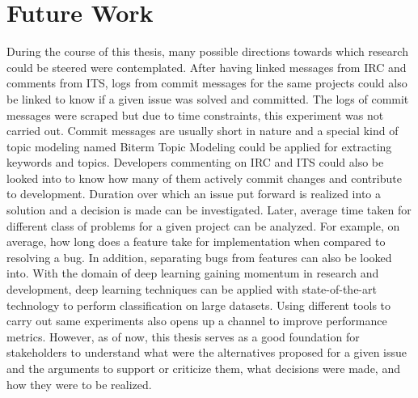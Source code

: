 \documentclass[a4paper,12pt,twoside]{report}
\begin{document}
\section{Future Work}
During the course of this thesis, many possible directions towards which research could be steered were contemplated. After having linked messages from IRC and comments from ITS, logs from commit messages for the same projects could also be linked to know if a given issue was solved and committed. The logs of commit messages were scraped but due to time constraints, this experiment was not carried out. Commit messages are usually short in nature and a special kind of topic modeling named Biterm Topic Modeling could be applied for extracting keywords and topics. Developers commenting on IRC and ITS could also be looked into to know how many of them actively commit changes and contribute to development. Duration over which an issue put forward is realized into a solution and a decision is made can be investigated. Later, average time taken for different class of problems for a given project can be analyzed. For example, on average, how long does a feature take for implementation when compared to resolving a bug. In addition, separating bugs from features can also be looked into. With the domain of deep learning gaining momentum in research and development, deep learning techniques can be applied with state-of-the-art technology to perform classification on large datasets. Using different tools to carry out same experiments also opens up a channel to improve performance metrics. However, as of now, this thesis serves as a good foundation for stakeholders to understand what were the alternatives proposed for a given issue and the arguments to support or criticize them, what decisions were made, and how they were to be realized. 



\appendix
\end{document}
